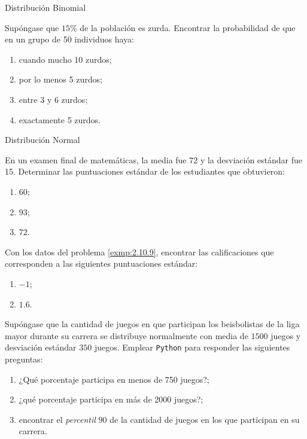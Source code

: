 




{Distribución Binomial}
 \begin{ejemplo}
  \label{exmp:2.10.8}
  Supóngase que $15\%$ de la población es zurda. Encontrar la probabilidad de que en un grupo de 50 individuos haya:
  \begin{enumerate}
   \item cuando mucho 10 zurdos;
   \item por lo menos 5 zurdos;
   \item entre 3 y 6 zurdos;
   \item exactamente 5 zurdos.
  \end{enumerate}

 \end{ejemplo}






{Distribución Normal}
 \begin{ejemplo}
  \label{exmp:2.10.9}
  En un examen final de matemáticas, la media fue 72 y la desviación estándar fue 15. Determinar las puntuaciones estándar de los estudiantes que obtuvieron:
  \begin{enumerate}
   \item $60$;
   \item $93$;
   \item $72$.
  \end{enumerate}

 \end{ejemplo}



 \begin{ejemplo}
   \label{exmp:2.10.10}
   Con los datos del problema \ref{exmp:2.10.9}, encontrar las calificaciones que corresponden a las siguientes puntuaciones estándar:
  \begin{enumerate}
   \item $-1$;
   \item $1.6$.
  \end{enumerate}

 \end{ejemplo}



 \begin{ejemplo}
  \label{exmp:2.10.11}
  Supóngase que la cantidad de juegos en que participan los beisbolistas de la liga mayor durante su carrera se distribuye normalmente con media de $1500$ juegos y desviación estándar $350$ juegos. Emplear \texttt{Python} para responder las siguientes preguntas:
  \begin{enumerate}
   \item ¿Qué porcentaje participa en menos de 750 juegos?;
   \item ¿qué porcentaje participa en más de 2000 juegos?;
   \item encontrar el \emph{percentil} $90$ de la cantidad de juegos en los que participan en su carrera.
  \end{enumerate}

 \end{ejemplo}


